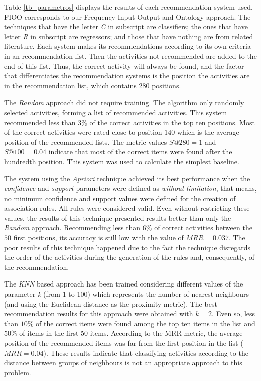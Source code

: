 \documentclass{RITA}
\begin{document}
Table \ref{tb_parametros} displays the results of each recommendation system used. FIOO corresponds to our Frequency Input Output and Ontology approach. The techniques that have the letter \emph{C} in subscript are classifiers; the ones that have letter \emph{R} in subscript are regressors; and those that have nothing are from related literature. Each system makes its recommendations according to its own criteria in an recommendation list. Then the activities not recommended are added to the end of this list. Thus, the correct activity will always be found, and the factor that differentiates the recommendation systems is the position the activities are in the recommendation list, which contains \(280\) positions.

The \emph{Random} approach did not require training. The algorithm only randomly selected activities, forming a list of recommended activities. This system recommended less than \(3\%\) of the correct activities in the top ten positions. Most of the correct activities were rated close to position \(140\) which is the average position of the recommended lists. The metric values \(S@280 = 1\) and \(S@100 = 0.04\) indicate that most of the correct items were found after the hundredth position. This system was used to calculate the simplest baseline.

The system using the \emph{Apriori} technique achieved its best performance when the \emph{confidence} and \emph{support} parameters were defined as \emph{without limitation}, that means, no minimum confidence and support values were defined for the creation of association rules. All rules were considered valid. Even without restricting these values, the results of this technique presented results better than only the \emph{Random} approach. Recommending less than \(6\%\) of correct activities between the \(50\) first positions, its accuracy is still low with the value of \(MRR = 0.037\). The poor results of this technique happened due to the fact the technique disregards the order of the activities during the generation of the rules and, consequently, of the recommendation.

The \emph{KNN}  based approach has been trained considering different values of the parameter \emph{k} (from 1 to 100) which represents the number of nearest neighbours (and using the Euclidean distance as the proximity metric). The best recommendation results for this approach were obtained with \(k = 2\). Even so, less than \(10\%\) of the correct items were found among the top ten items in the list and \(50\%\) of items in the first 50 items. According to the MRR metric, the average position of the recommended items was far from the first position in the list (\(MRR = 0.04\)). These results indicate that classifying activities according to the distance between groups of neighbours is not an appropriate approach to this problem.
\end{document}
